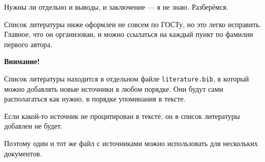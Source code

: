 \documentclass[14pt,oneside]{extarticle}
\begin{document}

Нужны ли отдельно и выводы, и заключение --- я не знаю. Разберёмся.

Список литературы ниже оформлен не совсем по ГОСТу, но это легко исправить. Главное, что он организован, и можно ссылаться на каждый пункт по фамилии первого автора.

\textbf{Внимание!} 

Список литературы находится в отдельном файле \verb|literature.bib|, в который можно добавлять новые источники в любом порядке. Они будут сами располагаться как нужно, в порядке упоминания в тексте.

Если какой-то источник не процитирован в тексте, он в список литературы добавлен не будет.

Поэтому один и тот же файл с источниками можно использовать для нескольких документов.


\pagebreak
\printbibliography
\end{document}
